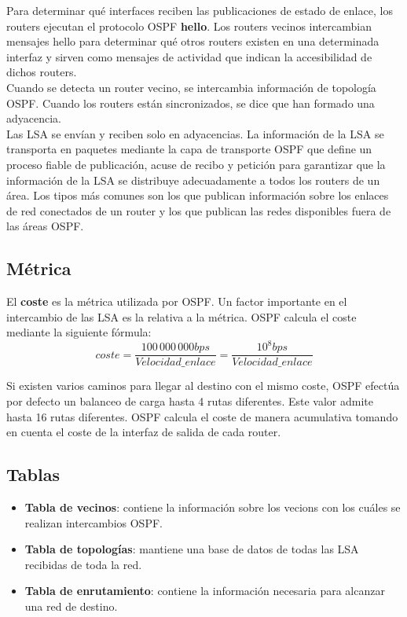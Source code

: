\documentclass[12pt]{article}
\begin{document}
Para determinar qué interfaces reciben las publicaciones de estado de enlace, los routers ejecutan el protocolo OSPF \textbf{hello}. Los routers vecinos intercambian mensajes hello para determinar qué otros routers existen en una determinada interfaz y sirven como mensajes de actividad que indican la accesibilidad de dichos routers.\\

Cuando se detecta un router vecino, se intercambia información de topología OSPF. Cuando los routers están sincronizados, se dice que han formado una adyacencia.\\

Las LSA se envían y reciben solo en adyacencias. La información de la LSA se transporta en paquetes mediante la capa de transporte OSPF que define un proceso fiable de publicación, acuse de recibo y petición para garantizar que la información de la LSA se distribuye adecuadamente a todos los routers de un área.  Los tipos más comunes son los que publican información sobre los enlaces de red conectados de un router y los que publican las redes disponibles fuera de las áreas OSPF.\\

\subsection{Métrica}
 El \textbf{coste} es la métrica utilizada por OSPF. Un factor importante en el intercambio de las LSA es la relativa a la métrica. OSPF calcula el coste mediante la siguiente fórmula:
$$ coste = \frac{100\,000\,000 bps}{Velocidad\_enlace} = \frac{10^8 bps}{Velocidad\_enlace}$$

Si existen varios caminos para llegar al destino con el mismo coste, OSPF efectúa por defecto un balanceo de carga hasta 4 rutas diferentes. Este valor admite hasta 16 rutas diferentes. OSPF calcula el coste de manera acumulativa tomando en cuenta el coste de la interfaz de salida de cada router.

\subsection{Tablas}
\begin{itemize}
\item \textbf{Tabla de vecinos}: contiene la información sobre los vecions con los cuáles se realizan intercambios OSPF.\\
\item \textbf{Tabla de topologías}: mantiene una base de datos de todas las LSA recibidas de toda la red.\\
\item \textbf{Tabla de enrutamiento}: contiene la información necesaria para alcanzar una red de destino.
\end{itemize}
\end{document}

